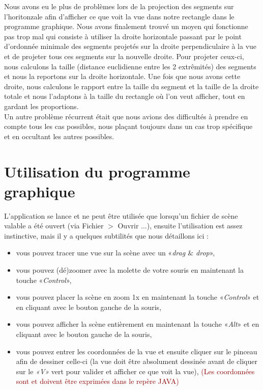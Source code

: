 \documentclass{article}
\newcommand{\red}[1]{\textcolor{darkred}{#1}}
\begin{document}
Nous avons eu le plus de problèmes lors de la projection des segments sur l'horitonzale afin d'afficher ce que voit la vue dans notre rectangle dans le programme graphique. Nous 
avons finalement trouvé un moyen qui fonctionne pas trop mal qui consiste à utiliser la droite horizontale passant par le point d'ordonnée minimale des segments projetés sur la 
droite perpendiculaire à la vue et de projeter tous ces segments sur la nouvelle droite. Pour projeter ceux-ci, nous calculons la taille (distance euclidienne entre les 2 extrêmités) 
des segments et nous la reportons sur la droite horizontale. Une fois que nous avons cette droite, nous calculons le rapport entre la taille du segment et la taille de la droite totale et 
nous l'adaptons à la taille du rectangle où l'on veut afficher, tout en gardant les proportions. \\

Un autre problème récurrent était que nous avions des difficultés à prendre en compte tous les cas possibles, nous plaçant toujours dans un cas trop spécifique et en occultant les 
autres possibles.

\section{Utilisation du programme graphique}

L'application se lance et ne peut être utilisée que lorsqu'un fichier de scène valable a été ouvert (via Fichier $>$ Ouvrir ...), ensuite l'utilisation est assez instinctive, mais il y a 
quelques subtilités que nous détaillons ici : 
\begin{itemize}
\item vous pouvez tracer une vue sur la scène avec un «\textit{drag $\&$ drop}»,
\item vous pouvez (dé)zoomer avec la molette de votre souris en maintenant la touche «\textit{Control}»,
\item vous pouvez placer la scène en zoom 1x en maintenant la touche «\textit{Control}» et en cliquant avec le bouton gauche de la souris,
\item vous pouvez afficher la scène entièrement en maintenant la touche «\textit{Alt}» et en cliquant avec le bouton gauche de la souris,
\item vous pouvez entrer les coordonnées de la vue et ensuite cliquer sur le pinceau afin de dessiner celle-ci (la vue doit être absolument dessinée avant de cliquer sur le 
\textit{«V»} vert pour valider et afficher ce que voit la vue), \red{(Les coordonnées sont et doivent être exprimées dans le repère JAVA)}
\end{itemize}
\end{document}
